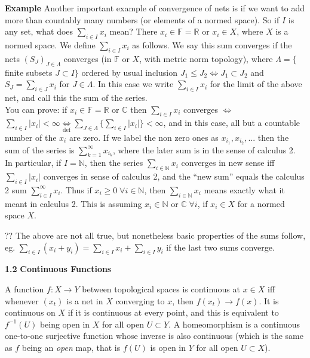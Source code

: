 \documentclass[12pt]{article}
\newcommand{\lrimply}[0] { \Leftrightarrow }
\newcommand{\nats}[0] { \mathbb{N}}
\newcommand{\reals}[0] { \mathbb{R}}
\newcommand{\scalars}[0] { \mathbb{F}}
\newcommand{\Cdb}[0] { \mathbb{C}}
\begin{document}
\begin{flushleft} {\bf Example }
Another important example of convergence of nets is if we want to add more than countably many numbers (or elements of a normed space). So if $I$ is any set, what does $\sum_{i \in I} x_i$ mean? There $x_i \in \scalars = \reals$ or $x_i \in X$, where $X$ is a normed space. We define $\sum_{i \in I} x_i$ as follows. We say this sum converges if the nets $(S_J)_{J \in \Lambda}$ converges (in $\scalars$ or $X$, with metric norm topology), where $\Lambda = \{ $ finite subsets $J \subset I \}$ ordered by usual inclusion $J_1 \le J_2 \lrimply J_1 \subset J_2$ and $S_J = \sum_{i \in J} x_i$ for $J \in \Lambda$. In this case we write $\sum_{i \in I} x_i$ for the limit of the above net, and call this the sum of the series. \\

You can prove: if $x_i  \in \scalars = \reals $ or $\Cdb$ then $\sum_{i \in I} x_i$ converges $\lrimply$ $\sum_{i \in I} |x_i| < \infty \underset{\textrm{def}}{\lrimply} \sum_{J \in \Lambda} \{ \sum_{i \in I} |x_i|  \} < \infty$, and in this case, all but a countable number of the $x_i$ are zero. If we label the non zero ones as $x_{i_1}, x_{i_2}, ... $ then the sum of the series is $\sum_{k=1}^\infty x_{i_k}$, where the later sum is in the sense of calculus 2. In particular, if $I = \nats$, then the series $\sum_{i \in \nats} x_i$ converges in new sense iff $ \sum_{i \in I} |x_i|$ converges in sense of calculus 2, and the ``new sum'' equals the calculus 2 sum $\sum_{i \in I}^\infty x_i$. Thus if $x_i \ge 0 \; \forall i \in \nats$, then $\sum_{i \in \nats} x_i$ means exactly what it meant in calculus 2. This is assuming $x_i \in \nats$ or $\Cdb \; \forall i$, if $x_i \in X$ for a normed space $X$. 

?? The above are not all true, but nonetheless basic properties of the sums follow, eg. $\sum_{i \in I}  (x_i + y_i) = \sum_{i \in I} x_i + \sum_{i \in I} y_i$ if the last two sums converge.
\end{flushleft}


\begin{flushleft} {\bf 1.2 }{\bf Continuous Functions }\end{flushleft} 



 A function $f : X \to Y$ between
topological spaces is continuous at $x \in X$ iff whenever $(x_t)$
is a net in $X$ converging to $x$, then $f(x_t) \to f(x)$. It is
continuous on $X$ if it is continuous at every point, and this is
equivalent to $f^{-1}(U)$ being open in $X$ for all open $U \subset
Y$. A homeomorphism is a continuous one-to-one surjective function
whose inverse is also continuous (which is the same as $f$ being an
{\em open} map, that is $f(U)$ is open in $Y$ for all open $U
\subset X$).
\end{document}
